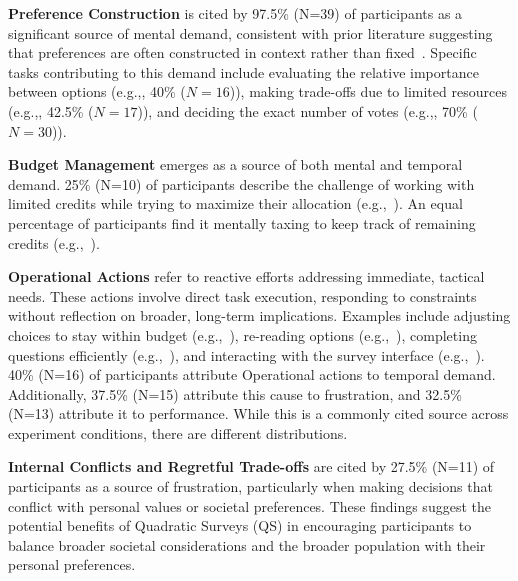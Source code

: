 \textbf{Preference Construction} is cited by 97.5\% (N=39) of participants as a significant source of mental demand, consistent with prior literature suggesting that preferences are often constructed in context rather than fixed~\cite{lichtensteinConstructionPreference2006}. Specific tasks contributing to this demand include evaluating the relative importance between options (e.g.,, 40\% ($N=16$)), making trade-offs due to limited resources (e.g.,, 42.5\% ($N=17$)), and deciding the exact number of votes (e.g.,, 70\% ($N=30$)).

\textbf{Budget Management} emerges as a source of both mental and temporal demand. 25\% (N=10) of participants describe the challenge of working with limited credits while trying to maximize their allocation (e.g.,~). An equal percentage of participants find it mentally taxing to keep track of remaining credits (e.g.,~).

\textbf{Operational Actions} refer to reactive efforts addressing immediate, tactical needs. These actions involve direct task execution, responding to constraints without reflection on broader, long-term implications. Examples include adjusting choices to stay within budget (e.g.,~), re-reading options (e.g.,~), completing questions efficiently (e.g.,~), and interacting with the survey interface (e.g.,~). 40\% (N=16) of participants attribute Operational actions to temporal demand. Additionally, 37.5\% (N=15) attribute this cause to frustration, and 32.5\% (N=13) attribute it to performance. While this is a commonly cited source across experiment conditions, there are different distributions. 

\textbf{Internal Conflicts and Regretful Trade-offs} are cited by 27.5\% (N=11) of participants as a source of frustration, particularly when making decisions that conflict with personal values or societal preferences. These findings suggest the potential benefits of Quadratic Surveys (QS) in encouraging participants to balance broader societal considerations and the broader population with their personal preferences.

